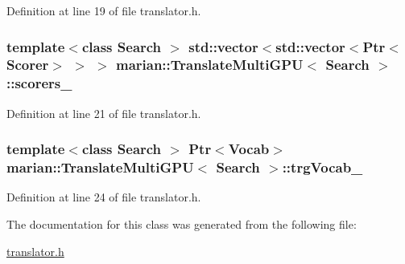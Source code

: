 Definition at line 19 of file translator.\+h.

\subsubsection[{\texorpdfstring{scorers\+\_\+}{scorers_}}]{\setlength{\rightskip}{0pt plus 5cm}template$<$class Search $>$ std\+::vector$<$std\+::vector$<${\bf Ptr}$<${\bf Scorer}$>$ $>$ $>$ {\bf marian\+::\+Translate\+Multi\+G\+PU}$<$ Search $>$\+::scorers\+\_\+\hspace{0.3cm}{\ttfamily [private]}}\hypertarget{classmarian_1_1TranslateMultiGPU_a783f8e4ecfcba37a2dc516fc685a403d}{}\label{classmarian_1_1TranslateMultiGPU_a783f8e4ecfcba37a2dc516fc685a403d}


Definition at line 21 of file translator.\+h.

\subsubsection[{\texorpdfstring{trg\+Vocab\+\_\+}{trgVocab_}}]{\setlength{\rightskip}{0pt plus 5cm}template$<$class Search $>$ {\bf Ptr}$<${\bf Vocab}$>$ {\bf marian\+::\+Translate\+Multi\+G\+PU}$<$ Search $>$\+::trg\+Vocab\+\_\+\hspace{0.3cm}{\ttfamily [private]}}\hypertarget{classmarian_1_1TranslateMultiGPU_a7a87528adeb1af7db2bdd9880634cd24}{}\label{classmarian_1_1TranslateMultiGPU_a7a87528adeb1af7db2bdd9880634cd24}


Definition at line 24 of file translator.\+h.



The documentation for this class was generated from the following file\+:\begin{DoxyCompactItemize}
\item 
\hyperlink{translator_8h}{translator.\+h}\end{DoxyCompactItemize}
